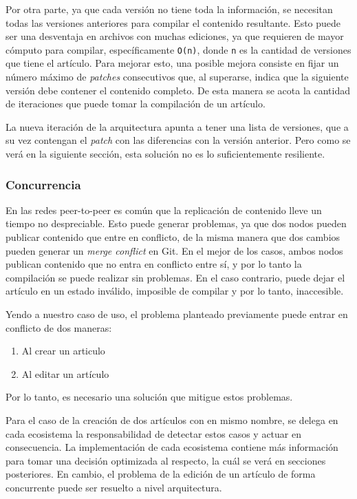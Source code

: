 Por otra parte, ya que cada versión no tiene toda la información, se necesitan todas las versiones anteriores para compilar el contenido resultante. Esto puede ser una desventaja en archivos con muchas ediciones, ya que requieren de mayor cómputo para compilar, específicamente \texttt{O(n)}, donde \texttt{n} es la cantidad de versiones que tiene el artículo. Para mejorar esto, una posible mejora consiste en fijar un número máximo de \textit{patches} consecutivos que, al superarse, indica que la siguiente versión debe contener el contenido completo. De esta manera se acota la cantidad de iteraciones que puede tomar la compilación de un artículo.

La nueva iteración de la arquitectura apunta a tener una lista de versiones, que a su vez contengan el \textit{patch} con las diferencias con la versión anterior. Pero como se verá en la siguiente sección, esta solución no es lo suficientemente resiliente.

\subsubsection{Concurrencia}

En las redes peer-to-peer es común que la replicación de contenido lleve un tiempo no despreciable. Esto puede generar problemas, ya que dos nodos pueden publicar contenido que entre en conflicto, de la misma manera que dos cambios pueden generar un \textit{merge conflict} en Git. En el mejor de los casos, ambos nodos publican
contenido que no entra en conflicto entre sí, y por lo tanto la compilación se puede realizar sin problemas. En el caso contrario, puede dejar el artículo en un estado inválido, imposible de compilar y por lo tanto, inaccesible.

Yendo a nuestro caso de uso, el problema planteado previamente puede entrar en conflicto de dos maneras:
\begin{enumerate}
    \item Al crear un articulo
    \item Al editar un artículo
\end{enumerate}

Por lo tanto, es necesario una solución que mitigue estos problemas.

Para el caso de la creación de dos artículos con en mismo nombre, se delega en cada ecosistema la responsabilidad de detectar estos casos y actuar en consecuencia. La implementación de cada ecosistema contiene más información para tomar una decisión optimizada al respecto, la cuál se verá en secciones posteriores. En cambio, el problema de la edición de un artículo de forma concurrente puede ser resuelto a nivel arquitectura.

